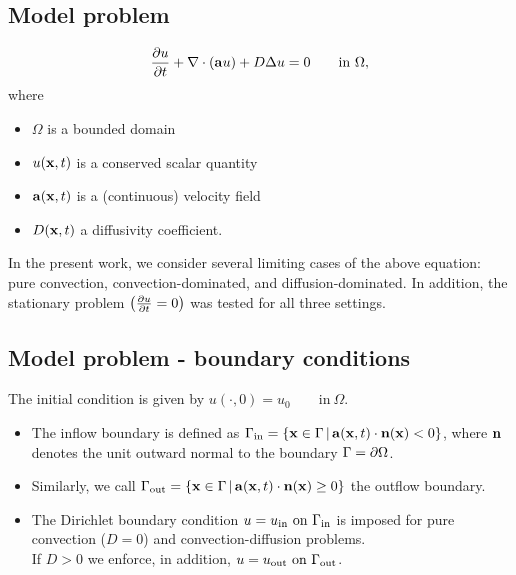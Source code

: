 \documentclass[mathserif]{beamer}
\begin{document}
\small

\subsection{Model problem}
\begin{frame}
\begin{equation}
\frac{\partial u}{\partial t}
+\nabla\cdot(\mathbf{a} u) + D \Delta u =0
\qquad\mbox{in}\ \Omega,\label{goveq}
\end{equation}
where
\begin{itemize}
\item $\Omega$ is a bounded domain
\item $u(\mathbf{x},t)$ is a conserved scalar quantity
\item $\mathbf{a}(\mathbf{x},t)$ is a (continuous) velocity field
\item $D(\mathbf{x},t)$ a diffusivity coefficient.
\end{itemize}
In the present work, we consider several limiting cases of the above equation: 
pure convection, convection-dominated, and diffusion-dominated. 
In addition, the stationary problem $\left(\frac{\partial u}{\partial t}=0\right)$ was tested for all three settings.

\end{frame}


\subsection{Model problem - boundary conditions}
\begin{frame}

The initial condition is given by $u(\cdot,0)=u_0\qquad\mbox{in}\ \Omega$.\ \\

\begin{itemize}
\item The inflow boundary is defined as $\Gamma_{\rm in}=\{\mathbf{x}\in\Gamma\,|\, \mathbf{a}(\mathbf{x}, t)\cdot\mathbf{n}(\mathbf{x})<0\}$, where $\mathbf{n}$ denotes the unit outward normal to the boundary $\Gamma=\partial\Omega$.
\item Similarly, we call $\Gamma_{\rm out}=\{\mathbf{x}\in\Gamma\,|\, \mathbf{a}(\mathbf{x}, t)\cdot\mathbf{n}(\mathbf{x}) \ge 0\}$ the outflow boundary.
\item The Dirichlet boundary condition $ u=u_{\rm in} \mbox{ on } \Gamma_{\rm in} \label{dbc}$ is imposed for pure convection ($D=0$) and convection-diffusion problems.
\\ \hspace{5mm}If $D>0$ we enforce, in addition, $u=u_{\rm out} \mbox{ on } \Gamma_{\rm out} \label{dbc2}$.
\end{itemize}
\end{frame}
\end{document}

